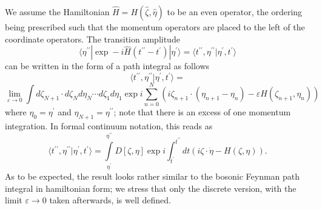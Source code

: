 \documentclass[a4paper,10pt]{article}
\begin{document}
We assume the Hamiltonian $\hat{H}=H(\hat{\zeta},\hat{\eta})$ to be an even operator, the 
ordering being prescribed such that the momentum operators are placed to the left of the 
coordinate operators. The transition amplitude
\begin{equation}
\langle\eta^{\prime\prime}|\exp-i\hat{H}(t^{\prime\prime}-
t^{\prime})|\eta^{\prime}\rangle=\langle t^{\prime\prime},\eta^{\prime\prime}|\eta^
{\prime},t^{\prime}\rangle
\end{equation}
can be written in the form of a path integral as follows
\begin{equation}
\langle t^{\prime\prime},\eta^{\prime\prime}|\eta^
{\prime},t^{\prime}\rangle=
\end{equation}
$$\lim_{\varepsilon \rightarrow 0}\int d\zeta_{N+1}\cdot d\zeta_Nd\eta_N\cdots 
d\zeta_1d\eta_1\exp i\sum\limits_{n=0}^{N}\left(i\zeta_{n+1}\cdot(\eta_{n+1}-\eta_n)-
\varepsilon H(\zeta_{n+1},\eta_n)\right)$$
where $\eta_0=\eta^{\prime}$ and $\eta_{N+1}=\eta^{\prime\prime}$; note that there is an 
excess of one momentum integration. In formal continuum notation, this reads as
\begin{equation}\label{actionunphysicalrealfermions}
\langle t^{\prime\prime},\eta^{\prime\prime}|\eta^
{\prime},t^{\prime}\rangle=\int\limits_{\eta^{\prime}}^{\eta^{\prime\prime}}
D[\zeta,\eta]\exp i\int_{t^{\prime}}^{t^{\prime\prime}}dt\left(i\zeta\cdot\dot{\eta}-
H(\zeta,\eta)\right).
\end{equation}
As to be expected, the result looks rather similar to the bosonic Feynman path integral 
in hamiltonian form; we stress that only the discrete version, with the limit 
$\varepsilon \rightarrow 0$ taken afterwards, is well defined.
\end{document}
